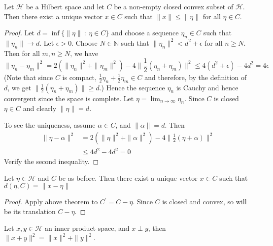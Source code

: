 
\begin{theorem}
  Let $\mathcal{H}$ be a Hilbert space and let $C$ be a non-empty closed convex
  subset of $\mathcal{H}$. Then there exist a unique vector $x \in C$ such that
  $\|x\| \le \|\eta\|$ for all $\eta \in C$.
\end{theorem}
\begin{proof}
  \marginnote{ \scriptsize \textcolor{red}{construction of the
  proof is a bit tricky}}
  Let $d = \inf \{ \|\eta\|  \ : \ \eta \in C  \}$ and choose a
  sequence $ \eta_n \in C$  such that $\|\eta_n\| \to d$. Let $
  \epsilon > 0$. Choose $N \in \mathbb{N}$ such that $\|\eta_n\|^2 <
  d^2 + \epsilon$ for all $n \ge N$. Then for all $m,n \ge N$, we have \[
    \|\eta_n - \eta_m\|^2 = 2(\|\eta_n\|^2 + \|\eta_m\|^2) - 4 \|
    \frac{1}{2}(\eta_n + \eta_m) \|^2 \le 4(d^2  + \epsilon) - 4d^2 = 4 \epsilon
  \]
  (Note that since $C$ is compact, $\frac{1}{2}\eta_n +
    \frac{1}{2}\eta_m \in C$ and therefore, by the definition of $d$,
  we get $\|\frac{1}{2}(\eta_n + \eta_m)\| \ge d$.) Hence the sequence
  $\eta_n$ is Cauchy and hence convergent since
  the space is complete. Let $\eta = \lim_{n \to \infty} \eta_n$.
  Since $C$ is closed $\eta \in C$ and clearly $\|\eta\| = d$.

  To see the uniqueness, assume $\alpha \in C$, and $\| \alpha\| = d$. Then
  \begin{align*}
    \|\eta - \alpha\|^2 &= 2(\|\eta\|^2 + \|\alpha\|^2) - 4 \|
    \frac{1}{2}(\eta + \alpha) \|^2 \\
    & \le 4d^2 - 4d^2 = 0
  \end{align*}
  Verify the second inequality.
\end{proof}

\begin{corollary}
  Let $\eta \in \mathcal{H}$ and $C$ be as before. Then there exist a unique
  vector $x \in C$ such that $d(\eta, C) = \|x - \eta\|$
\end{corollary}
\begin{proof}
  Apply above theorem to $C^\prime = C - \eta$. Since $C$ is closed
  and convex, so will be its translation $C - \eta$.
\end{proof}

\begin{proposition}
  Let $ x, y \in \mathcal{H}$ an inner product space, and $x \perp y$, then
  $\|x + y\|^2 = \|x\|^2 + \|y\|^2$.
\end{proposition}

